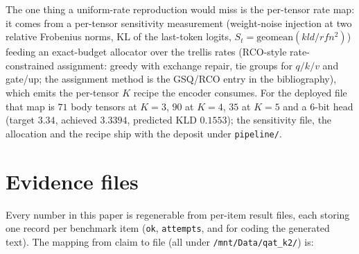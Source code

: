 \documentclass[11pt,a4paper]{article}
\begin{document}
The one thing a uniform-rate reproduction would miss is the per-tensor rate map: it comes from a
per-tensor sensitivity measurement (weight-noise injection at two relative Frobenius norms, KL of the
last-token logits, $S_t=\mathrm{geomean}(kld/rfn^2)$) feeding an exact-budget allocator over the trellis
rates (RCO-style rate-constrained assignment: greedy with exchange repair, tie groups for $q/k/v$ and
gate/up; the assignment method is the GSQ/RCO entry in the bibliography), which emits the per-tensor
$K$ recipe the encoder consumes. For the deployed file that map is $71$ body tensors at $K{=}3$, $90$ at
$K{=}4$, $35$ at $K{=}5$ and a $6$-bit head (target $3.34$, achieved $3.3394$, predicted KLD $0.1553$);
the sensitivity file, the allocation and the recipe ship with the deposit under \texttt{pipeline/}.

\section{Evidence files}
Every number in this paper is regenerable from per-item result files, each storing one record per
benchmark item (\texttt{ok}, \texttt{attempts}, and for coding the generated text). The mapping
from claim to file (all under \texttt{/mnt/Data/qat\_k2/}) is:
\end{document}

